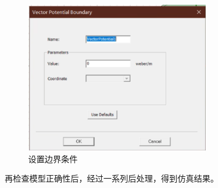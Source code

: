 \documentclass{article}
\begin{document}
          \begin{figure}[H]
            \centering
            \includegraphics[width=8cm]{img/17.png}
          \caption[]{设置边界条件}  
          
          \end{figure}
          再检查模型正确性后，经过一系列后处理，得到仿真结果。
          
\end{document}
